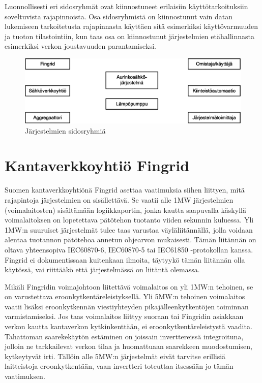 Luonnollisesti eri sidosryhmät ovat kiinnostuneet erilaisiin käyttötarkoituksiin soveltuvista rajapinnoista. Osa sidosryhmistä on kiinnostunut vain datan lukemiseen tarkoitetusta rajapinnasta käyttäen sitä esimerkiksi käyttövarmuuden ja tuoton tilastointiin, kun taas osa on kiinnostunut järjestelmien etähallinnasta esimerkiksi verkon joustavuuden parantamiseksi.

\begin{figure}[h]
  \centering
  \includegraphics[width=1\textwidth]{figures/sidosryhmat}
  \caption{Järjestelmien sidosryhmiä}
  \label{fig:sidosryhmat}
\end{figure}

\section{Kantaverkkoyhtiö Fingrid}
  Suomen kantaverkkoyhtiönä Fingrid asettaa vaatimuksia siihen liittyen, mitä rajapintoja järjestelmien on sisällettävä. Se vaatii alle 1MW järjestelmien (voimalaitosten) sisältämään logiikkaportin, jonka kautta saapuvalla käskyllä voimalaitoksen on lopetettava pätötehon tuotanto viiden sekunnin kuluessa. Yli 1MW:n suuruiset järjestelmät tulee taas varustaa väyläliitännällä, jolla voidaan alentaa tuotannon pätötehoa annetun ohjearvon mukaisesti. Tämän liitännän on oltava yhteensopiva IEC60870-6, IEC60870-5 tai IEC61850 -protokollan kanssa. Fingrid ei dokumentissaan kuitenkaan ilmoita, täytyykö tämän liitännän olla käytössä, vai riittääkö että järjestelmässä on liitäntä olemassa. \parencite{VJV2018}

  Mikäli Fingridin voimajohtoon liitettävä voimalaitos on yli 1MW:n tehoinen, se on varustettava eroonkytkentäreleistyksellä. Yli 5MW:n tehoinen voimalaitos vaatii lisäksi eroonkytkennän viestiyhteyden pikajälleenkytkentöjen toiminnan varmistamiseksi. Jos taas voimalaitos liittyy suoraan tai Fingridin asiakkaan verkon kautta kantaverkon kytkinkenttään, ei eroonkytkentäreleistystä vaadita. Tahattoman saarekekäytön estäminen on joissain inverttereissä integroituna, jolloin ne tarkkailevat verkon tilaa ja huomattuaan saarekkeen muodostumisen, kytkeytyvät irti. Tällöin alle 5MW:n järjestelmät eivät tarvitse erillisiä laitteistoja eroonkytkentään, vaan invertteri toteuttaa itsessään jo tämän vaatimuksen. 

